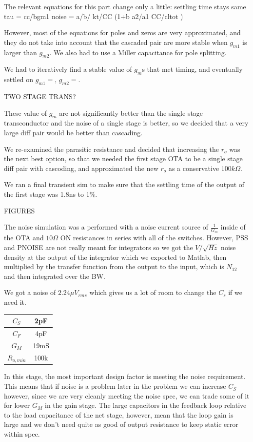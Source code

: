 \documentclass[conference]{IEEEtran}
\begin{document}
The relevant equations for this part change only a little:
settling time stays same tau = cc/bgm1
noise = a/b/ kt/CC (1+b a2/a1 CC/cltot )

However, most of the equations for poles and zeros are very approximated, and they do not take into account that the cascaded pair are more stable when $g_{m1}$ is larger than $g_{m2}$. We also had to use a Miller capacitance for pole splitting.

We had to iteratively find a stable value of $g_m$s that met timing, and eventually settled on $g_{m1}=$, $g_{m2}=$.

TWO STAGE TRANS?

These value of $g_m$ are not significantly better than the single stage transconductor and the noise of a single stage is better, so we decided that a very large diff pair would be better than cascading.

We re-examined the parasitic resistance and decided that increasing the $r_o$ was the next best option, so that we needed the first stage OTA to be a single stage diff pair with cascoding, and approximated the new $r_o$ as a conservative $100k\Omega$.

We ran a final transient sim to make sure that the settling time of the output of the first stage was 1.8ns to 1\%. 

FIGURES

The noise simulation was a performed with a noise current source of $\frac{1}{G_m}$ inside of the OTA and $10\Omega$ ON resistances in series with all of the switches. However, PSS and PNOISE are not really meant for integrators so we got the $V/\sqrt{Hz}$ noise density at the output of the integrator which we exported to Matlab, then multiplied by the transfer function from the output to the input, which is $N_{12}$ and then integrated over the BW.

We got a noise of $2.24\mu V_{rms}$ which gives us a lot of room to change the $C_s$ if we need it.

\begin{center}
\begin{tabular}{|c|c|} 
\hline
$C_S$ & 2pF \\
\hline
$C_F$ & 4pF \\
\hline
$G_M$ & 19mS \\
\hline
$R_{o,min}$ & 100k \\
\hline
\end{tabular}
\end{center}

In this stage, the most important design factor is meeting the noise requirement. This means that if noise is a problem later in the problem we can increase $C_S$ however, since we are very cleanly meeting the noise spec, we can trade some of it for lower $G_M$ in the gain stage. The large capacitors in the feedback loop relative to the load capacitance of the net stage, however, mean that the loop gain is large and we don't need quite as good of output resistance to keep static error within spec.
\end{document}
